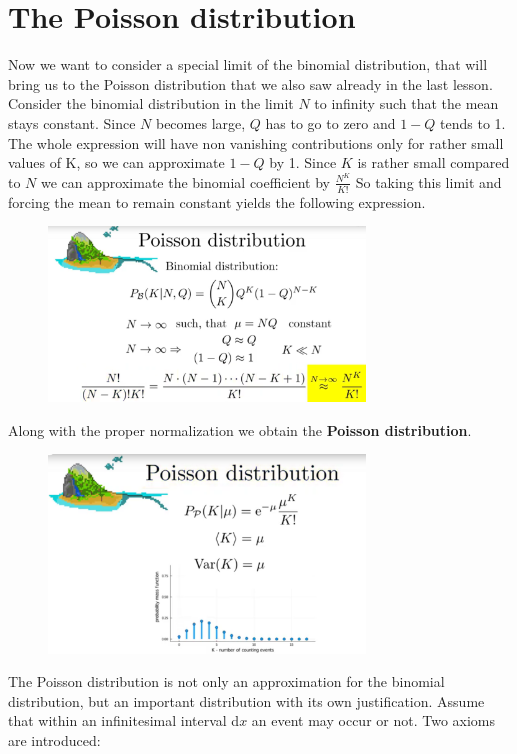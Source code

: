 \documentclass[12pt, a4paper]{scrartcl}
\begin{document}
\section*{The Poisson distribution}
Now we want to consider a special limit of the binomial distribution, that will bring us to the Poisson distribution that we also saw already in the last lesson.
Consider the binomial distribution in the limit $N$ to infinity such that the mean stays constant. Since $N$ becomes large, $Q$ has to go to zero and $1-Q$ tends to 1.
The whole expression will have non vanishing contributions only for rather small values of K, so we can approximate $1-Q$ by 1.
Since $K$ is rather small compared to $N$ we can approximate the binomial coefficient by $\frac{N^K}{K!}$
So taking this limit and forcing the mean to remain constant yields the following expression.
 \begin{figure}[H]
	\centering
	\includegraphics[width=0.75\textwidth]{4_9.png}
\end{figure}
Along with the proper normalization we obtain the \textbf{Poisson distribution}.
 \begin{figure}[H]
	\centering
	\includegraphics[width=0.75\textwidth]{4_10.png}
\end{figure}
The Poisson distribution is not only an approximation for the binomial distribution, but an important distribution with its own justification.
Assume that within an infinitesimal interval d$x$ an event may occur or not. 
Two axioms are introduced:\\
\end{document}

